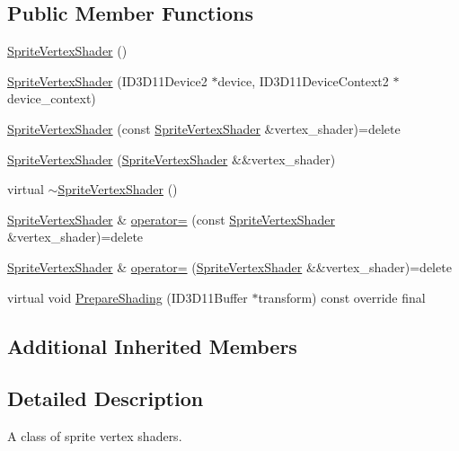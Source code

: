\subsection*{Public Member Functions}
\begin{DoxyCompactItemize}
\item 
\hyperlink{classmage_1_1_sprite_vertex_shader_a2c9628875d3ab758df9f077d5275b08c}{Sprite\+Vertex\+Shader} ()
\item 
\hyperlink{classmage_1_1_sprite_vertex_shader_a57f08ac16ace6190281fb4fa413c1b9e}{Sprite\+Vertex\+Shader} (I\+D3\+D11\+Device2 $\ast$device, I\+D3\+D11\+Device\+Context2 $\ast$device\+\_\+context)
\item 
\hyperlink{classmage_1_1_sprite_vertex_shader_a00f902a89cc3f9c9ce3d5b526eece29c}{Sprite\+Vertex\+Shader} (const \hyperlink{classmage_1_1_sprite_vertex_shader}{Sprite\+Vertex\+Shader} \&vertex\+\_\+shader)=delete
\item 
\hyperlink{classmage_1_1_sprite_vertex_shader_abc0c5838e2b1941b6a55dbe238e5b6f6}{Sprite\+Vertex\+Shader} (\hyperlink{classmage_1_1_sprite_vertex_shader}{Sprite\+Vertex\+Shader} \&\&vertex\+\_\+shader)
\item 
virtual \hyperlink{classmage_1_1_sprite_vertex_shader_a36e755541ea81318ccf518533358e0d3}{$\sim$\+Sprite\+Vertex\+Shader} ()
\item 
\hyperlink{classmage_1_1_sprite_vertex_shader}{Sprite\+Vertex\+Shader} \& \hyperlink{classmage_1_1_sprite_vertex_shader_a4400ddda9637b280b7c8aedeeec6e4e7}{operator=} (const \hyperlink{classmage_1_1_sprite_vertex_shader}{Sprite\+Vertex\+Shader} \&vertex\+\_\+shader)=delete
\item 
\hyperlink{classmage_1_1_sprite_vertex_shader}{Sprite\+Vertex\+Shader} \& \hyperlink{classmage_1_1_sprite_vertex_shader_aac64cf5df2b118ba95be72aef2bd3dca}{operator=} (\hyperlink{classmage_1_1_sprite_vertex_shader}{Sprite\+Vertex\+Shader} \&\&vertex\+\_\+shader)=delete
\item 
virtual void \hyperlink{classmage_1_1_sprite_vertex_shader_a10be47ca65f4baed735b5ffb52ee92bf}{Prepare\+Shading} (I\+D3\+D11\+Buffer $\ast$transform) const override final
\end{DoxyCompactItemize}
\subsection*{Additional Inherited Members}


\subsection{Detailed Description}
A class of sprite vertex shaders. 

